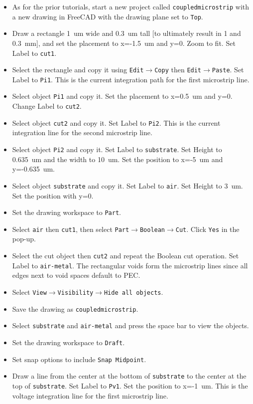 \documentclass[titlepage]{article}
\renewcommand\_{\textunderscore\linebreak[1]}
\begin{document}
\begin{itemize}
\item As for the prior tutorials, start a new project called \texttt{coupled\_microstrip} with a new drawing in FreeCAD with the drawing plane set to \texttt{Top}.
\item Draw a rectangle 1~um wide and 0.3~um tall [to ultimately result in 1 and 0.3~mm], and set the placement to x=-1.5~um and y=0.  Zoom to fit. Set Label to \texttt{cut1}.
\item Select the rectangle and copy it using \texttt{Edit}$\rightarrow$\texttt{Copy} then \texttt{Edit}$\rightarrow$\texttt{Paste}.  Set Label to \texttt{\_Pi1}.  This is the current integration path for the first microstrip line.
\item Select object \texttt{\_Pi1} and copy it.  Set the placement to x=0.5~um and y=0. Change Label to \texttt{cut2}.
\item Select object \texttt{cut2} and copy it.  Set Label to \texttt{\_Pi2}.  This is the current integration line for the second microstrip line.
\item Select object \texttt{\_Pi2} and copy it.  Set Label to \texttt{substrate}. Set Height to 0.635~um and the width to 10~um.  Set the position to x=-5~um and y=-0.635~um.
\item Select object \texttt{substrate} and copy it.  Set Label to \texttt{air}.  Set Height to 3~um. Set the position with y=0.
\item Set the drawing workspace to \texttt{Part}.
\item Select \texttt{air} then \texttt{cut1}, then select \texttt{Part}$\rightarrow$\texttt{Boolean}$\rightarrow$\texttt{Cut}.  Click \texttt{Yes} in the pop-up.
\item Select the cut object then \texttt{cut2} and repeat the Boolean cut operation. Set Label to \texttt{air-metal}.  The rectangular voids form the microstrip lines since all edges next to void spaces default to PEC.
\item Select \texttt{View}$\rightarrow$\texttt{Visibility}$\rightarrow$\texttt{Hide all objects}.
\item Save the drawing as \texttt{coupled\_microstrip}.
\item Select \texttt{substrate} and \texttt{air-metal} and press the space bar to view the objects.
\item Set the drawing workspace to \texttt{Draft}. 
\item Set snap options to include \texttt{Snap Midpoint}.
\item Draw a line from the center at the bottom of \texttt{substrate} to the center at the top of \texttt{substrate}.  Set Label to \texttt{\_Pv1}. Set the position to x=-1~um.  This is the voltage integration line for the first microstrip line.

\end{itemize}
\end{document}
